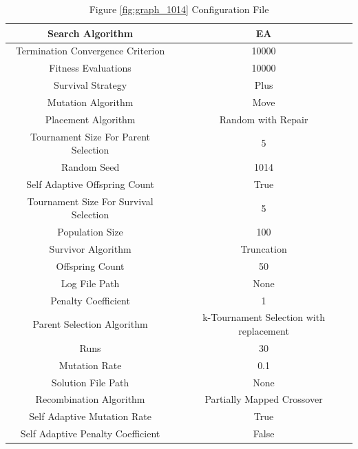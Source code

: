 \documentclass{standalone}
\begin{document}
\begin{table}[!htb]
	\centering
	\caption{Figure \ref{fig:graph_1014} Configuration File}
	\label{tab:graph_1014}
	\begin{tabular}{| c | c |}
		\hline
		Search Algorithm		& EA		 \\
		\hline
		Termination Convergence Criterion		& 10000		 \\
		\hline
		Fitness Evaluations		& 10000		 \\
		\hline
		Survival Strategy		& Plus		 \\
		\hline
		Mutation Algorithm		& Move		 \\
		\hline
		Placement Algorithm		& Random with Repair		 \\
		\hline
		Tournament Size For Parent Selection		& 5		 \\
		\hline
		Random Seed		& 1014		 \\
		\hline
		Self Adaptive Offspring Count		& True		 \\
		\hline
		Tournament Size For Survival Selection		& 5		 \\
		\hline
		Population Size		& 100		 \\
		\hline
		Survivor Algorithm		& Truncation		 \\
		\hline
		Offspring Count		& 50		 \\
		\hline
		Log File Path		& None		 \\
		\hline
		Penalty Coefficient		& 1		 \\
		\hline
		Parent Selection Algorithm		& k-Tournament Selection with replacement		 \\
		\hline
		Runs		& 30		 \\
		\hline
		Mutation Rate		& 0.1		 \\
		\hline
		Solution File Path		& None		 \\
		\hline
		Recombination Algorithm		& Partially Mapped Crossover		 \\
		\hline
		Self Adaptive Mutation Rate		& True		 \\
		\hline
		Self Adaptive Penalty Coefficient		& False		 \\
		\hline
	\end{tabular}
\end{table}
\end{document}
